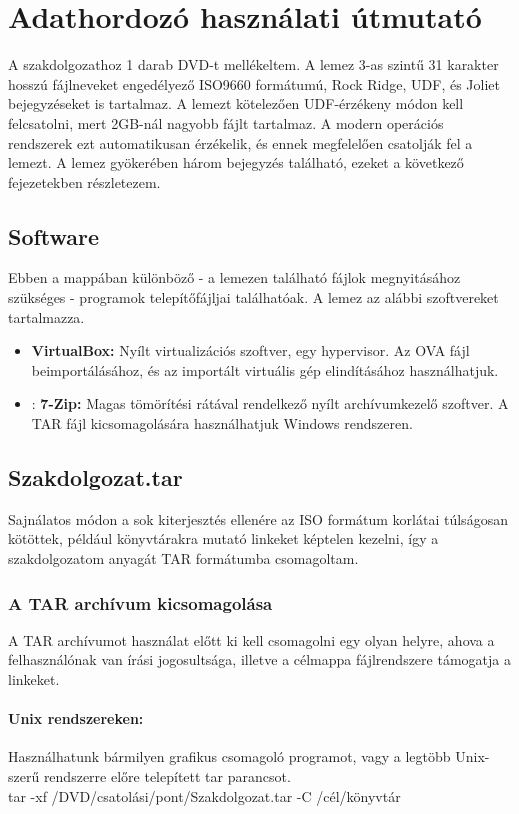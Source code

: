 \chapter*{Adathordozó használati útmutató}

A szakdolgozathoz 1 darab DVD-t mellékeltem. A lemez 3-as szintű 31 karakter hosszú fájlneveket engedélyező ISO9660 formátumú, Rock Ridge, UDF, és Joliet bejegyzéseket is tartalmaz. A lemezt kötelezően UDF-érzékeny módon kell felcsatolni, mert 2GB-nál nagyobb fájlt tartalmaz. A modern operációs rendszerek ezt automatikusan érzékelik, és ennek megfelelően csatolják fel a lemezt. A lemez gyökerében három bejegyzés található, ezeket a következő fejezetekben részletezem.

\section{Software}
Ebben a mappában különböző - a lemezen található fájlok megnyitásához szükséges - programok telepítőfájljai találhatóak. A lemez az alábbi szoftvereket tartalmazza.
\begin{itemize}
	\item \textbf{VirtualBox:} Nyílt virtualizációs szoftver, egy hypervisor. Az OVA fájl beimportálásához, és az importált virtuális gép elindításához használhatjuk.
	\item: \textbf{7-Zip:} Magas tömörítési rátával rendelkező nyílt archívumkezelő szoftver. A TAR fájl kicsomagolására használhatjuk Windows rendszeren.
\end{itemize}

\section{Szakdolgozat.tar}
Sajnálatos módon a sok kiterjesztés ellenére az ISO formátum korlátai túlságosan kötöttek, például könyvtárakra mutató linkeket képtelen kezelni, így a szakdolgozatom anyagát TAR formátumba csomagoltam.

\subsection{A TAR archívum kicsomagolása}
A TAR archívumot használat előtt ki kell csomagolni egy olyan helyre, ahova a felhasználónak van írási jogosultsága, illetve a célmappa fájlrendszere támogatja a linkeket.

\subsubsection{Unix rendszereken:}
Használhatunk bármilyen grafikus csomagoló programot, vagy a legtöbb Unix-szerű rendszerre előre telepített tar parancsot.\\
tar -xf /DVD/csatolási/pont/Szakdolgozat.tar -C /cél/könyvtár

